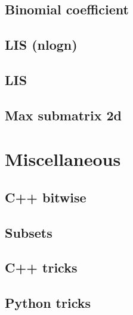 \subsection{Binomial coefficient}
\raggedbottom
\hrulefill
\subsection{LIS (nlogn)}
\raggedbottom
\hrulefill
\subsection{LIS}
\raggedbottom
\hrulefill
\subsection{Max submatrix 2d}
\raggedbottom
\hrulefill

\section{Miscellaneous}
\subsection{C++ bitwise}
\raggedbottom
\hrulefill
\subsection{Subsets}
\raggedbottom
\hrulefill
\subsection{C++ tricks}
\raggedbottom
\hrulefill
\subsection{Python tricks}
\raggedbottom
\hrulefill


